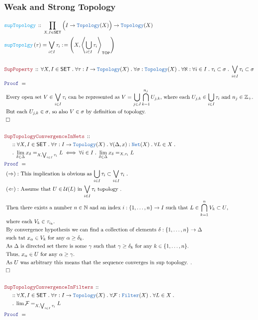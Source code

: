 \documentclass[12pt]{scrartcl}
\newcommand{\TYPE}[1]{\textcolor{NavyBlue}{\mathtt{#1}}}
\newcommand{\FUNC}[1]{\textcolor{Cerulean}{\mathtt{#1}}}
\newcommand{\LOGIC}[1]{\textcolor{Blue}{\mathtt{#1}}}
\newcommand{\THM}[1]{\textcolor{Maroon}{\mathtt{#1}}}
\renewcommand{\.}{\; . \;}
\newcommand{\de}{: \kern 0.1pc =}
\newcommand{\Act}[1]{\left( #1 \right)}
\newcommand{\Theorem}[2]{& \THM{#1} \, :: \, #2 \\ & \Proof = \\ }
\newcommand{\DeclareFunc}[2]{& \FUNC{#1} \, :: \, #2 \\}
\newcommand{\DefineNamedFunc}[4]{&  \FUNC{#1}\Act{#2} = #3 \de #4 \\}
\newcommand{\NewLine}{\\ & \kern 1pc}
\newcommand{\Page}[1]{ \begin{align*} #1 \end{align*}   }
\newcommand{\Explain}[1]{& \text{#1.} \\}
\newcommand{\ExplainFurther}[1]{& \text{#1} \\}
\newcommand{\Int}{\mathbb{Z} }
\newcommand{\Nat}{\mathbb{N} }
\newcommand{\QED}{\; \square}
\newcommand{\EndProof}{& \QED \\}
\newcommand{\Proof}{\LOGIC{Proof} \; }
\newcommand{\SET}{\mathsf{SET}}
\newcommand{\Topology}{\TYPE{Topology}}
\newcommand{\Net}{\TYPE{Net}}
\newcommand{\Filter}{\TYPE{Filter}}
\newcommand{\TOP}{\mathsf{TOP}}
\newcommand{\U}{\mathcal{U}}
\newcommand{\F}{\mathcal{F}}
\begin{document}
\subsubsection{Weak and Strong Topology}
\Page{
	\DeclareFunc{supTopology}
	{
		\prod_{X,I \in \SET} \Big(I \to \Topology(X)\Big) \to  \Topology(X)
	}
	\DefineNamedFunc{supTopolgy}
	{\tau}{\bigvee_{i \in I} \tau_i }{\left( X  ,\left\langle \bigcup_{i \in I} \tau_i  \right\rangle_\TOP\right)}
	\\
	\Theorem{SupPoperty}
	{
		\forall X,I \in \SET \.
		\forall \tau : I \to \Topology(X) \.
		\forall \sigma : \Topology(X) \.
		\forall \aleph : \forall i \in I \. \tau_i \subset \sigma \.
		\bigvee_{i \in I} \tau_i \subset \sigma 
	}
	\Explain{
		Every open set $V \in \bigvee_{i \in I} \tau_i $ can be represented as
		$V = \bigcup_{j \in J} \bigcap^{n_j}_{k=1} U_{j,k}$, where each 
		$U_{j,k} \in \bigcup_{i \in I} \tau_i$ and $n_j \in \Int_+$}
	\Explain{
		But each $U_{j,k} \in \sigma$, so also $V \in \sigma$
		by definition of topology}
	\EndProof
	\\
	\Theorem{SupTopologyConvergenceInNets}
	{
		\NewLine ::		
		\forall X,I \in \SET \.
		\forall \tau : I \to \Topology(X) \.
		\forall (\Delta,x) : \Net(X) \.
		\forall L \in X \. \NewLine \.
		\lim_{\delta \in \Delta} x_\delta  =_{X,\bigvee_{i \in I} \tau_i} L 
		\iff 
		\forall i \in I \. \lim_{\delta \in \Delta} x_\delta  =_{X,\tau_i} L 
	}
	\Explain{
		$(\Rightarrow):$
		This implication is obvious as $\bigcup_{i \in I} \tau_i \subset \bigvee_{i \in I} \tau_i$ }
	\Explain{ $(\Leftarrow):$
		Assume that $U \in \U(L)$ in $\bigvee_{i \in I} \tau_i$ topology
	}
	\ExplainFurther{
		Then there exists a number $n \in \Nat$ and an index $i :\{1,\ldots,n\} \to I$
		such that $L \in \bigcap^{n}_{k=1} V_k \subset U$,}
	\Explain{ where each $V_k \in \tau_{i_k}$}
	\ExplainFurther{
		By convergence hypothesis we can find a collection of elements $\delta : \{1,\ldots,n\} \to \Delta$}
	\Explain{ such tat $x_\alpha \in V_k$ for any $\alpha \ge \delta_k$}
	\Explain{
		As $\Delta$ is directed set there is some $\gamma$ such that $\gamma \ge \delta_k$
		for any $k  \in \{1,\ldots,n\}$}
	\Explain{
		Thus, $x_\alpha \in U$ for any $\alpha \ge \gamma$}
	\Explain{
		As $U$ was arbitrary this means that the sequence converges in sup topology.
	}
	\EndProof
	\\
	\Theorem{SupTopologyConvergenceInFilters}
	{
		\NewLine ::		
		\forall X,I \in \SET \.
		\forall \tau : I \to \Topology(X) \.
		\forall \F : \Filter(X) \.
		\forall L \in X \. \NewLine \.
		\lim \F  =_{X,\bigvee_{i \in I} \tau_i} L 
}}
\end{document}
